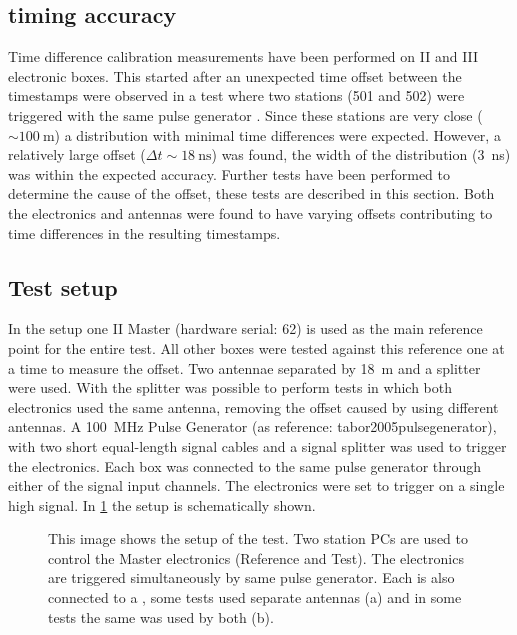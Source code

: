 \subsection{\gps timing accuracy}
\label{sec:gps_accuracy}

Time difference calibration measurements have been performed on \hisparc II and III electronic boxes. This started after an unexpected time offset between the timestamps were observed in a test where two \hisparc stations (501 and 502) were triggered with the same pulse generator \cite[p. 47]{fokkema2012hisparc}. Since these stations are very close ($\sim\SI{100}{\meter}$) a distribution with minimal time differences were expected. However, a relatively large offset ($\Delta t \sim\SI{18}{\ns}$) was found, the width of the distribution (\SI{3}{\ns}) was within the expected \gps accuracy. Further tests have been performed to determine the cause of the offset, these tests are described in this section. Both the \hisparc electronics and \gps antennas were found to have varying offsets contributing to time differences in the resulting timestamps.


\subsection{Test setup}
\label{sub:gps_test_setup}

In the setup one \hisparc II Master (hardware serial: 62) is used as the main reference point for the entire test. All other \hisparc boxes were tested against this reference one at a time to measure the offset. Two \gps antennae separated by \SI{18}{\meter} and a \gps splitter were used. With the splitter was possible to perform tests in which both \hisparc electronics used the same \gps antenna, removing the offset caused by using different \gps antennas. A \SI{100}{\mega\hertz} Pulse Generator (as reference: tabor2005pulsegenerator), with two short equal-length signal cables and a signal splitter was used to trigger the \hisparc electronics. Each box was connected to the same pulse generator through either of the signal input channels. The electronics were set to trigger on a single high signal. In \cref{fig:setup} the setup is schematically shown.

\begin{figure}
    \centering
    
    \caption{This image shows the setup of the test. Two station PCs are used to control the \hisparc Master electronics (Reference and Test). The electronics are triggered simultaneously by same pulse generator. Each is also connected to a \gps, some tests used separate \gps antennas (a) and in some tests the same \gps was used by both (b).}
    \label{fig:setup}
\end{figure}


